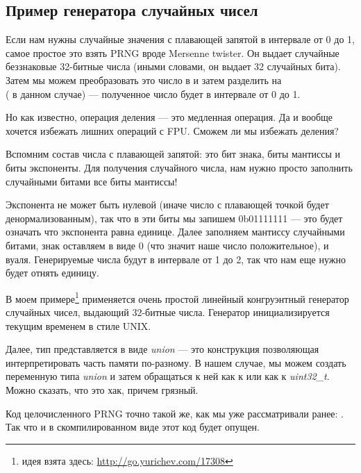\subsection{Пример генератора случайных чисел}
\label{FPU_PRNG}

Если нам нужны случайные значения с плавающей запятой в интервале от 0 до 1, самое простое это взять
\ac{PRNG} вроде Mersenne twister.
Он выдает случайные беззнаковые 32-битные числа (иными словами, он выдает 32 случайных бита).
Затем мы можем преобразовать это число в \Tfloat и затем разделить на \\
 ( в данном случае) --- полученное число будет в интервале от 0 до 1.

Но как известно, операция деления --- это медленная операция. 
Да и вообще хочется избежать лишних операций с FPU.
Сможем ли мы избежать деления?

Вспомним состав числа с плавающей запятой: это бит знака, биты мантиссы и биты экспоненты. 
Для получения случайного числа, нам нужно просто заполнить случайными битами все биты мантиссы!

Экспонента не может быть нулевой (иначе число с плавающей точкой будет денормализованным), 
так что в эти биты мы запишем 0b01111111 --- это будет означать что экспонента равна единице.
Далее заполняем мантиссу случайными битами, знак оставляем в виде 0 (что значит наше число положительное), и вуаля.
Генерируемые числа будут в интервале от 1 до 2, так что нам еще нужно будет отнять единицу.

\newcommand{\URLXOR}{\url{http://go.yurichev.com/17308}}

В моем примере\footnote{идея взята здесь: \URLXOR} 
применяется очень простой линейный конгруэнтный генератор случайных чисел, выдающий 32-битные числа.
Генератор инициализируется текущим временем в стиле UNIX.

Далее, тип \Tfloat представляется в виде \emph{union} --- это конструкция \CCpp позволяющая 
интерпретировать часть памяти по-разному. В нашем случае, мы можем создать переменную типа \emph{union} 
и затем обращаться к ней как к \Tfloat или как к \emph{uint32\_t}. Можно сказать, что это хак, причем грязный.


Код целочисленного \ac{PRNG} точно такой же, как мы уже рассматривали ранее: .
Так что и в скомпилированном виде этот код будет опущен.



